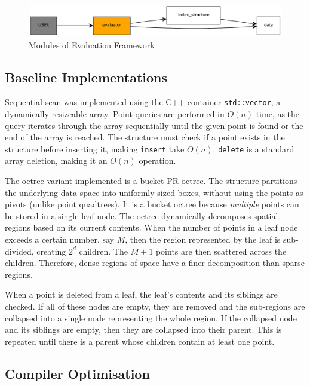 \begin{figure}
	\centering
	\includegraphics[scale=0.6]{figures/evaluation_framework.pdf}
	\caption{Modules of Evaluation Framework}
	\label{fig:evaluation-framework}
\end{figure}

\subsection{Baseline Implementations}
 
Sequential scan was implemented using the C++ container \texttt{std::vector}, a dynamically resizeable array.  Point queries are performed in $O(n)$ time, as the query iterates through the array sequentially until the given point is found or the end of the array is reached. The structure must check if a point exists in the structure before inserting it, making \texttt{insert} take $O(n)$. \texttt{delete} is a standard array deletion, making it an $O(n)$ operation.

The octree variant implemented is a bucket PR octree. The structure partitions the underlying data space into uniformly sized boxes, without using the points as pivots (unlike point quadtrees). It is a bucket octree because \textit{multiple} points can be stored in a single leaf node. The octree dynamically decomposes spatial regions based on its current contents. When the number of points in a leaf node exceeds a certain number, say $M$, then the region represented by the leaf is sub-divided, creating $2^d$ children. The $M + 1$ points are then scattered across the children. Therefore, dense regions of space have a finer decomposition than sparse regions.

When a point is deleted from a leaf, the leaf's contents and its siblings are checked. If all of these nodes are empty, they are removed and the sub-regions are collapsed into a single node representing the whole region. If the collapsed node and its siblings are empty, then they are collapsed into their parent. This is repeated until there is a parent whose children contain at least one point.

\subsection{Compiler Optimisation}

